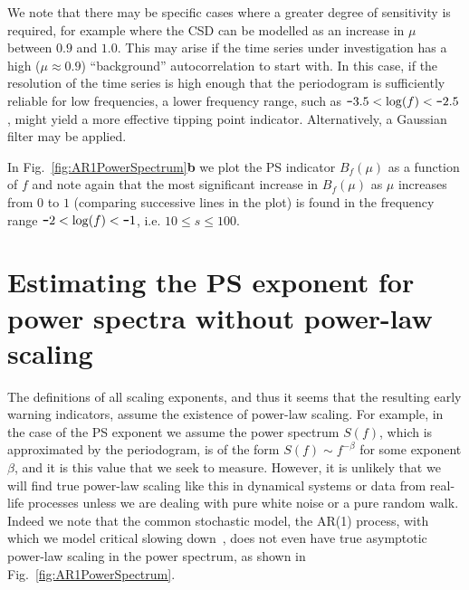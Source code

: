 \documentclass[10pt]{iopart}
\newcommand{\m}{\textup{\texttt{-}}}
\begin{document}
We note that there may be specific cases where a greater degree of sensitivity is required, for example where the CSD can be modelled as an increase in $\mu$ between $0.9$ and $1.0$. This may arise if the time series under investigation has a high ($\mu \approx 0.9$) ``background'' autocorrelation to start with. In this case, if the resolution of the time series is high enough that the periodogram is sufficiently reliable for low frequencies, a lower frequency range, such as $\m3.5<\log(f)<\m2.5$, might yield a more effective tipping point indicator. Alternatively, a Gaussian filter may be applied.

In Fig.~\ref{fig:AR1PowerSpectrum}{\bf b} we plot the PS indicator $B_f(\mu)$ as a function of $f$ and note again that the most significant increase in $B_f(\mu)$ as $\mu$ increases from $0$ to $1$ (comparing successive lines in the plot) is found in the frequency range $\m2<\log(f)<\m1$, i.e. $10\leq s\leq 100$.




\section{Estimating the PS exponent for power spectra without power-law scaling}
\label{sec:noTrueScaling}

The definitions of all scaling exponents, and thus it seems that the resulting early warning indicators, assume the existence of power-law scaling. For example, in the case of the PS exponent we assume the power spectrum $S(f)$, which is approximated by the periodogram, is of the form $S(f)\sim f^{-\beta}$ for some exponent $\beta$, and it is this value that we seek to measure. However, it is unlikely that we will find true power-law scaling like this in dynamical systems or data from real-life processes unless we are dealing with pure white noise or a pure random walk. Indeed we note that the common stochastic model, the AR(1) process, with which we model critical slowing down~\cite{scheffer2009critical}, does not even have true asymptotic power-law scaling in the power spectrum, as shown in Fig.~\ref{fig:AR1PowerSpectrum}.
\end{document}
